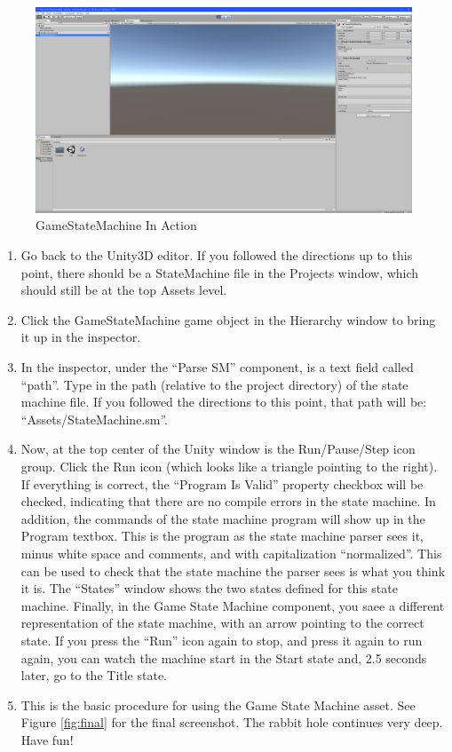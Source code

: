 \documentclass[letter,12pt]{article}
\begin{document}
\begin{figure}
 \includegraphics[width=6in]{final.png}
 \caption{GameStateMachine In Action}
 \label{fig:vs}
\end{figure}
\begin{enumerate}
\item Go back to the Unity3D editor.  If you followed the directions up to this point, there should be a StateMachine file in the Projects window, which should still be at the top Assets level.

\item Click the GameStateMachine game object in the Hierarchy window to bring it up in the inspector.

\item In the inspector, under the “Parse SM” component, is a text field called “path”.  Type in the path (relative to the project directory) of the state machine file.  If you followed the directions to this point, that path will be: “Assets/StateMachine.sm”.

\item Now, at the top center of the Unity window is the Run/Pause/Step icon group.  Click the Run icon (which looks like a triangle pointing to the right).  If everything is correct, the “Program Is Valid” property checkbox will be checked, indicating that there are no compile errors in the state machine.  In addition, the commands of the state machine program will show up in the Program textbox.  This is the program as the state machine parser sees it, minus white space and comments, and with capitalization “normalized”.  This can be used to check that the state machine the parser sees is what you think it is.  The “States” window shows the two states defined for this state machine.  Finally, in the Game State Machine component, you saee a different representation of the state machine, with an arrow pointing to the correct state.  If you press the “Run” icon again to stop, and press it again to run again, you can watch the machine start in the Start state and, 2.5 seconds later, go to the Title state.  

\item This is the basic procedure for using the Game State Machine asset.  See Figure \ref{fig:final} for the final screenshot.  The rabbit hole continues very deep.  Have fun! 
\end{enumerate}
\end{document}

